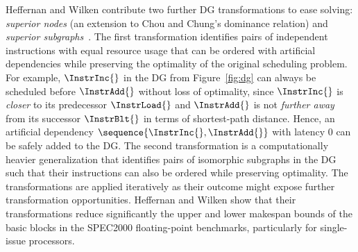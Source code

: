 \documentclass[acmsmall,authorversion,nonacm]{acmart}
\begin{document}
Heffernan and Wilken contribute two further DG transformations to ease
solving: \emph{superior nodes} (an extension to Chou and Chung's
dominance relation) and \emph{superior
  subgraphs}~\cite{Heffernan2006}.
The first transformation identifies pairs of independent instructions
with equal resource usage that can be ordered with artificial
dependencies while preserving the optimality of the original
scheduling problem.
For example, $\InstrInc{}$ in the DG from Figure~\ref{fig:dg} can
always be scheduled before $\InstrAdd{}$ without loss of optimality,
since $\InstrInc{}$ is \emph{closer} to its predecessor $\InstrLoad{}$
and $\InstrAdd{}$ is not \emph{further away} from its successor
$\InstrBlt{}$ in terms of shortest-path distance.
Hence, an artificial dependency $\sequence{\InstrInc{}, \InstrAdd{}}$
with latency 0 can be safely added to the DG.
The second transformation is a computationally heavier generalization
that identifies pairs of isomorphic subgraphs in the DG such that
their instructions can also be ordered while preserving optimality.
The transformations are applied iteratively as their outcome might
expose further transformation opportunities.
Heffernan and Wilken show that their transformations reduce
significantly the upper and lower makespan bounds of the basic blocks
in the SPEC2000 floating-point benchmarks, particularly for
single-issue processors.
\end{document}
